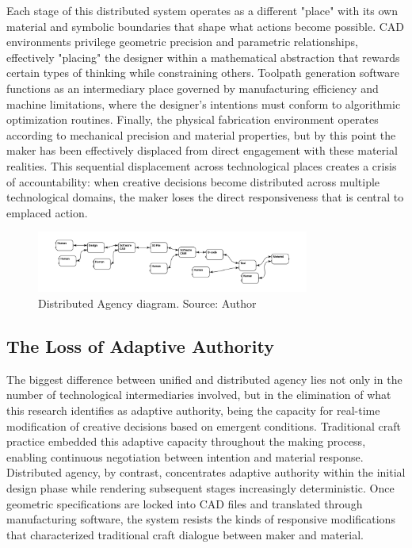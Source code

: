 Each stage of this distributed system operates as a different "place" with its own material and symbolic boundaries that shape what actions become possible. CAD environments privilege geometric precision and parametric relationships, effectively "placing" the designer within a mathematical abstraction that rewards certain types of thinking while constraining others. Toolpath generation software functions as an intermediary place governed by manufacturing efficiency and machine limitations, where the designer's intentions must conform to algorithmic optimization routines. Finally, the physical fabrication environment operates according to mechanical precision and material properties, but by this point the maker has been effectively displaced from direct engagement with these material realities. This sequential displacement across technological places creates a crisis of accountability: when creative decisions become distributed across multiple technological domains, the maker loses the direct responsiveness that is central to emplaced action.

\begin{figure}[h]
\centering
\includegraphics[width=0.8\textwidth]{figures/chapter1/fragmented agency.png}
\caption{Distributed Agency diagram. Source: Author}
\label{fig:distributed_agency}
\end{figure}

\subsection{The Loss of Adaptive Authority}

The biggest difference between unified and distributed agency lies not only in the number of technological intermediaries involved, but in the elimination of what this research identifies as adaptive authority, being the capacity for real-time modification of creative decisions based on emergent conditions. Traditional craft practice embedded this adaptive capacity throughout the making process, enabling continuous negotiation between intention and material response. Distributed agency, by contrast, concentrates adaptive authority within the initial design phase while rendering subsequent stages increasingly deterministic. Once geometric specifications are locked into CAD files and translated through manufacturing software, the system resists the kinds of responsive modifications that characterized traditional craft dialogue between maker and material.


